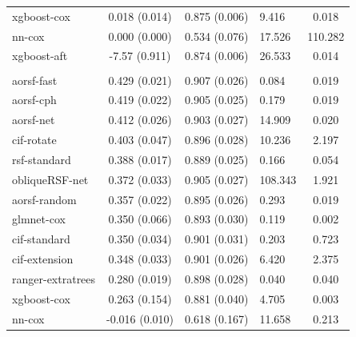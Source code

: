 \documentclass[twoside,11pt]{article}\usepackage[]{graphicx}\usepackage[]{xcolor}
\newenvironment{knitrout}{}{} %
\begin{document}
\begin{knitrout}
\begin{longtable}[t]{lcclc}
\hspace{1em}xgboost-cox & 0.018 (0.014) & 0.875 (0.006) & 9.416 & 0.018\\
\hspace{1em}nn-cox & 0.000 (0.000) & 0.534 (0.076) & 17.526 & 110.282\\
\hspace{1em}xgboost-aft & -7.57 (0.911) & 0.874 (0.006) & 26.533 & 0.014\\
\addlinespace[0.3em]
\hline
\multicolumn{5}{l}{\textit{\textbf{Primary biliary cholangitis; death, n = 276, p = 19}}}\\
\hline
\hspace{1em}aorsf-fast & 0.429 (0.021) & 0.907 (0.026) & 0.084 & 0.019\\
\hspace{1em}aorsf-cph & 0.419 (0.022) & 0.905 (0.025) & 0.179 & 0.019\\
\hspace{1em}aorsf-net & 0.412 (0.026) & 0.903 (0.027) & 14.909 & 0.020\\
\hspace{1em}cif-rotate & 0.403 (0.047) & 0.896 (0.028) & 10.236 & 2.197\\
\hspace{1em}rsf-standard & 0.388 (0.017) & 0.889 (0.025) & 0.166 & 0.054\\
\hspace{1em}obliqueRSF-net & 0.372 (0.033) & 0.905 (0.027) & 108.343 & 1.921\\
\hspace{1em}aorsf-random & 0.357 (0.022) & 0.895 (0.026) & 0.293 & 0.019\\
\hspace{1em}glmnet-cox & 0.350 (0.066) & 0.893 (0.030) & 0.119 & 0.002\\
\hspace{1em}cif-standard & 0.350 (0.034) & 0.901 (0.031) & 0.203 & 0.723\\
\hspace{1em}cif-extension & 0.348 (0.033) & 0.901 (0.026) & 6.420 & 2.375\\
\hspace{1em}ranger-extratrees & 0.280 (0.019) & 0.898 (0.028) & 0.040 & 0.040\\
\hspace{1em}xgboost-cox & 0.263 (0.154) & 0.881 (0.040) & 4.705 & 0.003\\
\hspace{1em}nn-cox & -0.016 (0.010) & 0.618 (0.167) & 11.658 & 0.213\\

\end{longtable}
\end{knitrout}
\end{document}
